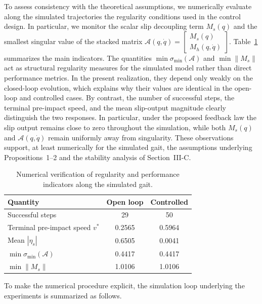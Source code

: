 \documentclass[letterpaper, 10 pt, conference]{ieeeconf}
\begin{document}
{To assess consistency with the theoretical assumptions, we numerically evaluate along the simulated trajectories the regularity conditions used in the control design. In particular, we monitor the scalar slip decoupling term $M_s(q)$ and the smallest singular value of the stacked matrix
$\mathcal A(q,\dot q)=
\begin{bmatrix}
M_s(q)\\
M_h(q,\dot q)
\end{bmatrix}$. Table~\ref{tab:assumptions} summarizes the main indicators. The quantities $\min \sigma_{\min}(\mathcal A)$ and $\min \|M_s\|$ act as structural regularity measures for the simulated model rather than direct performance metrics. In the present realization, they depend only weakly on the closed-loop evolution, which explains why their values are identical in the open-loop and controlled cases. By contrast, the number of successful steps, the terminal pre-impact speed, and the mean slip-output magnitude clearly distinguish the two responses. In particular, under the proposed feedback law the slip output remains close to zero throughout the simulation, while both $M_s(q)$ and $\mathcal A(q,\dot q)$ remain uniformly away from singularity. These observations support, at least numerically for the simulated gait, the assumptions underlying Propositions~1--2 and the stability analysis of Section~III-C.

\begin{table}[h!]
\centering
\small
\setlength{\tabcolsep}{4pt}
\caption{Numerical verification of regularity and performance indicators along the simulated gait.}
\label{tab:assumptions}
\begin{tabular}{lcc}
\hline
Quantity & Open loop & Controlled \\
\hline
Successful steps & 29 & 50 \\
Terminal pre-impact speed $v^\ast$ & 0.2565 & 0.5964 \\
Mean $|\eta_s|$ & 0.6505 & 0.0041 \\
$\min \sigma_{\min}(\mathcal A)$ & 0.4417 & 0.4417 \\
$\min \|M_s\|$ & 1.0106 & 1.0106 \\
\hline
\end{tabular}
\end{table}


To make the numerical procedure explicit, the simulation loop underlying the experiments is summarized as follows.

}
\end{document}
